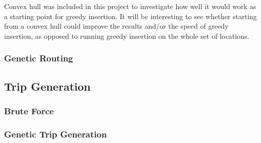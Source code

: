 \noindent
Convex hull was included in this project to investigate how well it would work as a starting point for greedy
insertion.
It will be interesting to see whether starting from a convex hull could improve the results and/or the speed of
greedy insertion, as opposed to running greedy insertion on the whole set of locations.

\subsubsection{Genetic Routing}\label{subsubsec:genetic-routing}

\subsection{Trip Generation}\label{subsec:trip-generation}
\subsubsection{Brute Force}\label{subsubsec:brute-force-trip-generation}
\subsubsection{Genetic Trip Generation}
